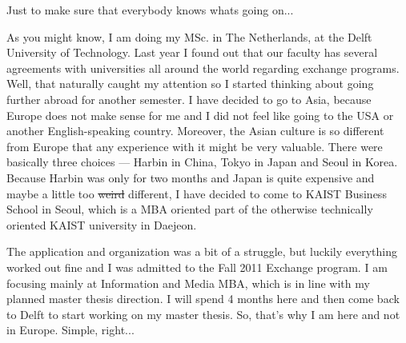 \begin{post}
	\begin{content}
Just to make sure that everybody knows whats going on...

As you might know, I am doing my MSc. in The Netherlands, at the Delft University of Technology. Last year I found out that our faculty has several agreements with universities all around the world regarding exchange programs. Well, that naturally caught my attention so I started thinking about going further abroad for another semester. I have decided to go to Asia, because Europe does not make sense for me and I did not feel like going to the USA or another English-speaking country. Moreover, the Asian culture is so different from Europe that any experience with it might be very valuable. There were basically three choices — Harbin in China, Tokyo in Japan and Seoul in Korea. Because Harbin was only for two months and Japan is quite expensive and maybe a little too \sout{weird} different, I have decided to come to KAIST Business School in Seoul, which is a MBA oriented part of the otherwise technically oriented KAIST university in Daejeon.

The application and organization was a bit of a struggle, but luckily everything worked out fine and I was admitted to the Fall 2011 Exchange program. I am focusing mainly at Information and Media MBA, which is in line with my planned master thesis direction. I will spend 4 months here and then come back to Delft to start working on my master thesis. So, that's why I am here and not in Europe. Simple, right...
	\end{content}
\end{post}
